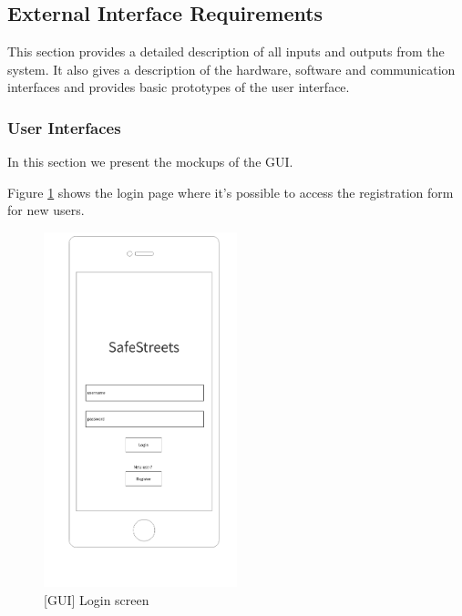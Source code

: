 \subsection{External Interface Requirements}
This section provides a detailed description of all inputs and outputs from the system. It also gives a description of the hardware, software and communication interfaces and provides basic prototypes of the user interface.

\subsubsection{User Interfaces}
In this section we present the mockups of the GUI.

Figure \ref{fig:login} shows the login page where it's possible to access the registration form for new users.
 \begin{figure}[H]
		\centering
      \includegraphics[width=0.5\textwidth]{GUI/login.png}
      \caption{[GUI] Login screen}   \label{fig:login}
\end{figure}


